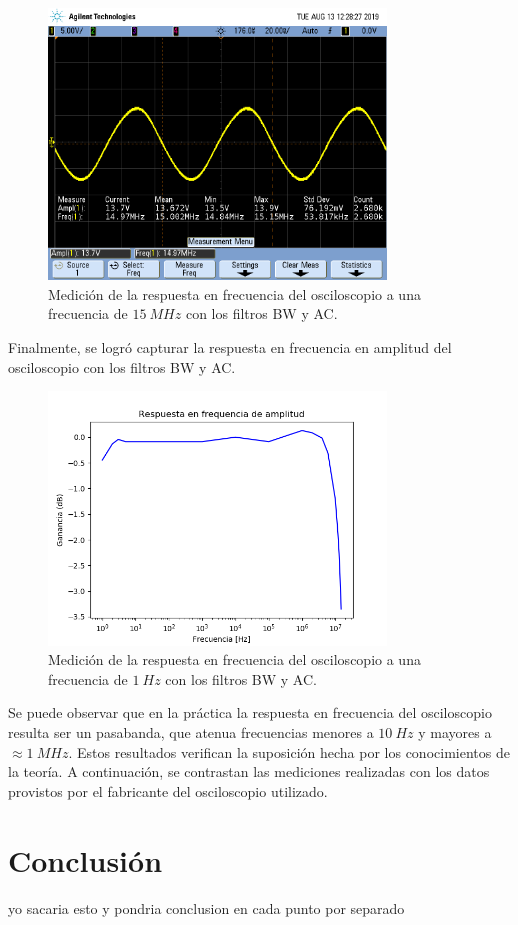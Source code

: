 \documentclass[a4paper]{article}
\begin{document}
\begin{figure}[H]
	\centering
	\includegraphics[width=0.8\textwidth,trim={0.7cm 5cm  0.5 8cm},clip]{osci15mhz.png}
	\caption{Medición de la respuesta en frecuencia del osciloscopio a una frecuencia de $15 \ MHz$ con los filtros BW y AC.} 
	\label{graf:osci_freq_alta}
\end{figure}


Finalmente, se logró capturar la respuesta en frecuencia en amplitud del osciloscopio con los filtros BW y AC.

\begin{figure}[H]
	\centering
	\includegraphics[width=0.8\textwidth]{resp_freq_osci.png}
	\caption{Medición de la respuesta en frecuencia del osciloscopio a una frecuencia de $1 \ Hz$ con los filtros BW y AC.} 
	\label{graf:resp_freq_osci}
\end{figure}

Se puede observar que en la práctica la respuesta en frecuencia del osciloscopio resulta ser un pasabanda, que atenua frecuencias menores a $10 \ Hz$ y mayores a $\approx 1 \ MHz$. Estos resultados verifican la suposición hecha por los conocimientos de la teoría. A continuación, se contrastan las mediciones realizadas con los datos provistos por el fabricante del osciloscopio utilizado.

\section*{Conclusión}

yo sacaria esto y pondria conclusion en cada punto por separado
\end{document}
